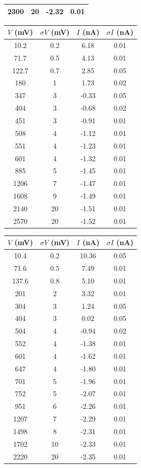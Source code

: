 \documentclass[10pt,a4paper]{article}
\begin{document}
\begin{table}[!ht]
\begin{tabular}{|c|c|c|c|}
2300 & 20 & -2.32 & 0.01\\
\hline
\end{tabular}
\begin{tabular}{|c|c|c|c|}
\hline
$V$ (mV) & $\sigma V$ (mV) & $I$ (nA) & $\sigma I$ (nA)\\
\hline
10.2 & 0.2 & 6.18 & 0.01\\
71.7 & 0.5 & 4.13 & 0.01\\
122.7 & 0.7 & 2.85 & 0.05\\
180 & 1 & 1.73 & 0.02\\
347 & 3 & -0.33 & 0.05\\
404 & 3 & -0.68 & 0.02\\
451 & 3 & -0.91 & 0.01\\
508 & 4 & -1.12 & 0.01\\
551 & 4 & -1.23 & 0.01\\
601 & 4 & -1.32 & 0.01\\
885 & 5 & -1.45 & 0.01\\
1206 & 7 & -1.47 & 0.01\\
1608 & 9 & -1.49 & 0.01\\
2140 & 20 & -1.51 & 0.01\\
2570 & 20 & -1.52 & 0.01\\
\hline
\end{tabular}
\begin{tabular}{|c|c|c|c|}
\hline
$V$ (mV) & $\sigma V$ (mV) & $I$ (nA) & $\sigma I$ (nA)\\
\hline
10.4 & 0.2 & 10.36 & 0.05\\
71.6 & 0.5 & 7.49 & 0.01\\
137.6 & 0.8 & 5.10 & 0.01\\
201 & 2 & 3.32 & 0.01\\
304 & 3 & 1.24 & 0.05\\
404 & 3 & 0.02 & 0.05\\
504 & 4 & -0.94 & 0.02\\
552 & 4 & -1.38 & 0.01\\
601 & 4 & -1.62 & 0.01\\
647 & 4 & -1.80 & 0.01\\
701 & 5 & -1.96 & 0.01\\
752 & 5 & -2.07 & 0.01\\
951 & 6 & -2.26 & 0.01\\
1207 & 7 & -2.29 & 0.01\\
1498 & 8 & -2.31 & 0.01\\
1702 & 10 & -2.33 & 0.01\\
2220 & 20 & -2.35 & 0.01\\

\end{tabular}
\end{table}
\end{document}
